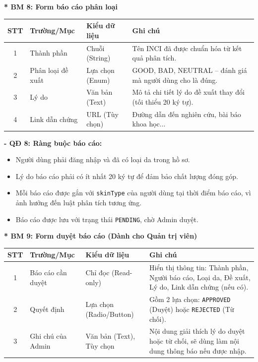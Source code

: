 \documentclass[12pt,a4paper]{article}
\begin{document}
\textbf{* BM 8: Form báo cáo phân loại}
\begin{center}
\begin{tabular}{|c|p{3.5cm}|p{3.5cm}|p{5cm}|}
\hline
\textbf{STT} & \textbf{Trường/Mục} & \textbf{Kiểu dữ liệu} & \textbf{Ghi chú} \\
\hline
1 & Thành phần & Chuỗi (String) & Tên INCI đã được chuẩn hóa từ kết quả phân tích. \\
\hline
2 & Phân loại đề xuất & Lựa chọn (Enum) & GOOD, BAD, NEUTRAL – đánh giá mà người dùng cho là đúng. \\
\hline
3 & Lý do & Văn bản (Text) & Mô tả chi tiết lý do đề xuất thay đổi (tối thiểu 20 ký tự). \\
\hline
4 & Link dẫn chứng & URL (Tùy chọn) & Đường dẫn đến nghiên cứu, bài báo khoa học... \\
\hline
\end{tabular}
\end{center}

\textbf{- QĐ 8: Ràng buộc báo cáo:}
\begin{itemize}
    \item Người dùng phải đăng nhập và đã có loại da trong hồ sơ.
    \item Lý do báo cáo phải có ít nhất 20 ký tự để đảm bảo chất lượng đóng góp.
    \item Mỗi báo cáo được gắn với \texttt{skinType} của người dùng tại thời điểm báo cáo, vì ảnh hưởng đến luật phân tích tương ứng.
    \item Báo cáo được lưu với trạng thái \texttt{PENDING}, chờ Admin duyệt.
\end{itemize}





\vspace{0.5cm}
\textbf{* BM 9: Form duyệt báo cáo (Dành cho Quản trị viên)}
\begin{center}
\begin{tabular}{|c|p{3.5cm}|p{3.5cm}|p{5cm}|}
\hline
\textbf{STT} & \textbf{Trường/Mục} & \textbf{Kiểu dữ liệu} & \textbf{Ghi chú} \\
\hline
1 & Báo cáo cần duyệt & Chỉ đọc (Read-only) & Hiển thị thông tin: Thành phần, Người báo cáo, Loại da, Đề xuất, Lý do, Link dẫn chứng (nếu có). \\
\hline
2 & Quyết định & Lựa chọn (Radio/Button) & Gồm 2 lựa chọn: \texttt{APPROVED} (Duyệt) hoặc \texttt{REJECTED} (Từ chối). \\
\hline
3 & Ghi chú của Admin & Văn bản (Text), Tùy chọn & Nội dung giải thích lý do duyệt hoặc từ chối, sẽ dùng làm nội dung thông báo nếu được nhập. \\
\hline
\end{tabular}
\end{center}
\end{document}
